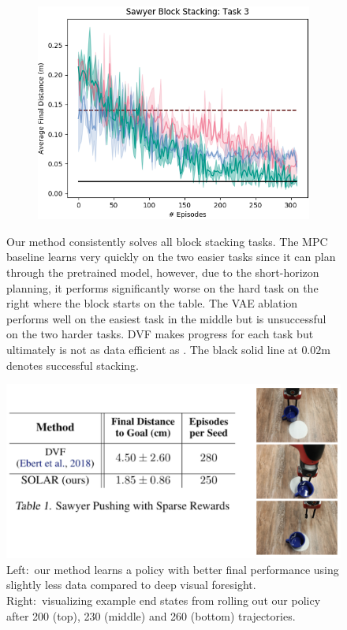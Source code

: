 \begin{figure}
\begin{subfigure}{0.32\linewidth}
        \includegraphics[width=\linewidth]{img/solar/stacking-3.png}
        \caption{}
    \end{subfigure}
    \caption[Results of \metabbr\ on real robotics tasks]{Our method consistently solves all block stacking tasks. The MPC baseline learns very quickly on the two easier tasks since it can plan through the pretrained model, however, due to the short-horizon planning, it performs significantly worse on the hard task on the right where the block starts on the table. The VAE ablation performs well on the easiest task in the middle but is unsuccessful on the two harder tasks. DVF makes progress for each task but ultimately is not as data efficient as \metabbr. The black solid line at $0.02$m denotes successful stacking.}
    \label{fig:stacking-results}
    \vspace{-.5em}
\end{figure}

\begin{figure}
    \centering
    \includegraphics[width=\linewidth]{img/solar/pushing-table.png}
    \caption{Left:~our method learns a policy with better final performance using slightly less data compared to deep visual foresight. Right:~visualizing example end states from rolling out our policy after 200 (top), 230 (middle) and 260 (bottom) trajectories.}
    \label{fig:pushing-results}
    \vspace{-.5em}
\end{figure}

